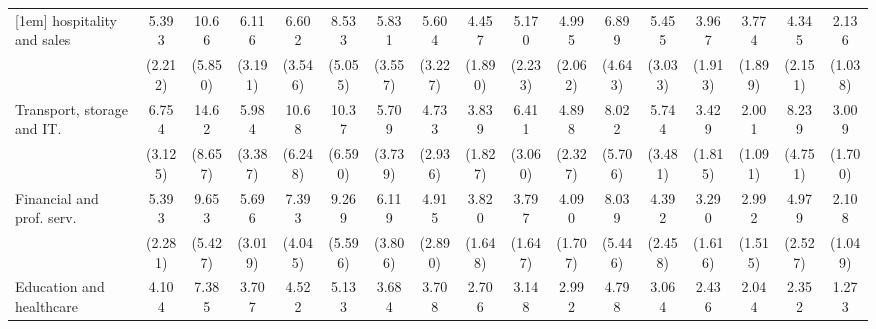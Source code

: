 {\begin{tabular}{l*{16}{c}}
[1em]
hospitality and sales&       5.393\sym{***}&       10.66\sym{***}&       6.116\sym{***}&       6.602\sym{***}&       8.533\sym{***}&       5.831\sym{**} &       5.604\sym{**} &       4.457\sym{***}&       5.170\sym{***}&       4.995\sym{***}&       6.899\sym{**} &       5.455\sym{**} &       3.967\sym{**} &       3.774\sym{**} &       4.345\sym{**} &       2.136         \\
                    &     (2.212)         &     (5.850)         &     (3.191)         &     (3.546)         &     (5.055)         &     (3.557)         &     (3.227)         &     (1.890)         &     (2.233)         &     (2.062)         &     (4.643)         &     (3.033)         &     (1.913)         &     (1.899)         &     (2.151)         &     (1.038)         \\
[1em]
Transport, storage and IT.&       6.754\sym{***}&       14.62\sym{***}&       5.984\sym{**} &       10.68\sym{***}&       10.37\sym{***}&       5.709\sym{**} &       4.733\sym{*}  &       3.839\sym{**} &       6.411\sym{***}&       4.898\sym{***}&       8.022\sym{**} &       5.744\sym{**} &       3.429\sym{*}  &       2.001         &       8.239\sym{***}&       3.009         \\
                    &     (3.125)         &     (8.657)         &     (3.387)         &     (6.248)         &     (6.590)         &     (3.739)         &     (2.936)         &     (1.827)         &     (3.060)         &     (2.327)         &     (5.706)         &     (3.481)         &     (1.815)         &     (1.091)         &     (4.751)         &     (1.700)         \\
[1em]
Financial and prof. serv.&       5.393\sym{***}&       9.653\sym{***}&       5.696\sym{**} &       7.393\sym{***}&       9.269\sym{***}&       6.119\sym{**} &       4.915\sym{**} &       3.820\sym{**} &       3.797\sym{**} &       4.090\sym{***}&       8.039\sym{**} &       4.392\sym{**} &       3.290\sym{*}  &       2.992\sym{*}  &       4.979\sym{**} &       2.108         \\
                    &     (2.281)         &     (5.427)         &     (3.019)         &     (4.045)         &     (5.596)         &     (3.806)         &     (2.890)         &     (1.648)         &     (1.647)         &     (1.707)         &     (5.446)         &     (2.458)         &     (1.616)         &     (1.515)         &     (2.527)         &     (1.049)         \\
[1em]
Education and healthcare&       4.104\sym{***}&       7.385\sym{***}&       3.707\sym{*}  &       4.522\sym{**} &       5.133\sym{**} &       3.684\sym{*}  &       3.708\sym{*}  &       2.706\sym{*}  &       3.148\sym{**} &       2.992\sym{**} &       4.798\sym{*}  &       3.064\sym{*}  &       2.436         &       2.044         &       2.352         &       1.273         \\

\end{tabular}}
